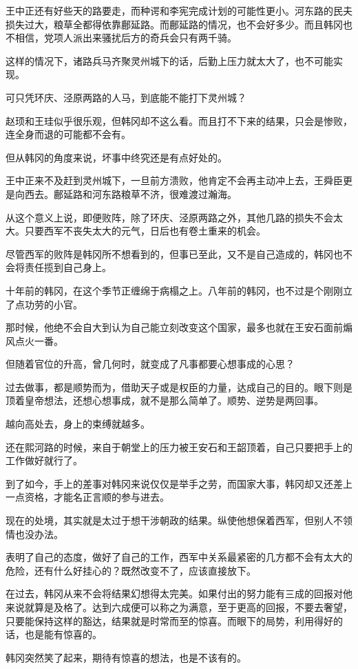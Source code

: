 王中正还有好些天的路要走，而种谔和李宪完成计划的可能性更小。河东路的民夫损失过大，粮草全都得依靠鄜延路。而鄜延路的情况，也不会好多少。而且韩冈也不相信，党项人派出来骚扰后方的奇兵会只有两千骑。

这样的情况下，诸路兵马齐聚灵州城下的话，后勤上压力就太大了，也不可能实现。

可只凭环庆、泾原两路的人马，到底能不能打下灵州城？

赵顼和王珪似乎很乐观，但韩冈却不这么看。而且打不下来的结果，只会是惨败，连全身而退的可能都不会有。

但从韩冈的角度来说，坏事中终究还是有点好处的。

王中正来不及赶到灵州城下，一旦前方溃败，他肯定不会再主动冲上去，王舜臣更是向西去。鄜延路和河东路粮草不济，很难渡过瀚海。

从这个意义上说，即便败阵，除了环庆、泾原两路之外，其他几路的损失不会太大。只要西军不丧失太大的元气，日后也有卷土重来的机会。

尽管西军的败阵是韩冈所不想看到的，但事已至此，又不是自己造成的，韩冈也不会将责任揽到自己身上。

十年前的韩冈，在这个季节正缠绵于病榻之上。八年前的韩冈，也不过是个刚刚立了点功劳的小官。

那时候，他绝不会自大到认为自己能立刻改变这个国家，最多也就在王安石面前煽风点火一番。

但随着官位的升高，曾几何时，就变成了凡事都要心想事成的心思？

过去做事，都是顺势而为，借助天子或是权臣的力量，达成自己的目的。眼下则是顶着皇帝想法，还想心想事成，就不是那么简单了。顺势、逆势是两回事。

越向高处去，身上的束缚就越多。

还在熙河路的时候，来自于朝堂上的压力被王安石和王韶顶着，自己只要把手上的工作做好就行了。

到了如今，手上的差事对韩冈来说仅仅是举手之劳，而国家大事，韩冈却又还差上一点资格，才能名正言顺的参与进去。

现在的处境，其实就是太过于想干涉朝政的结果。纵使他想保着西军，但别人不领情也没办法。

表明了自己的态度，做好了自己的工作，西军中关系最紧密的几方都不会有太大的危险，还有什么好挂心的？既然改变不了，应该直接放下。

在过去，韩冈从来不会将结果幻想得太完美。如果付出的努力能有三成的回报对他来说就算是及格了。达到六成便可以称之为满意，至于更高的回报，不要去奢望，只要能保持这样的豁达，结果就是时常而至的惊喜。而眼下的局势，利用得好的话，也是能有惊喜的。

韩冈突然笑了起来，期待有惊喜的想法，也是不该有的。

